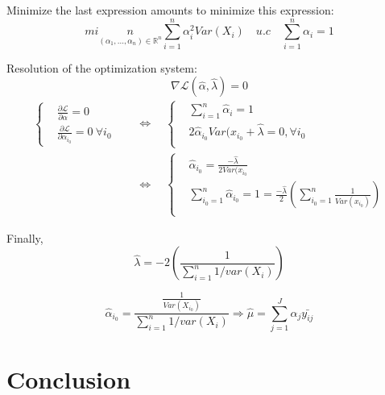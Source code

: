 \documentclass[unknownkeysallowed]{beamer}
\begin{document}
\begin{frame}
Minimize the last expression amounts to minimize this expression: 
    $$ min\limits_{(\alpha_{1},...,\alpha_{n})\in \mathbb{R}^{n}} \sum\limits_{i=1}^{n}\alpha_{i}^{2}Var(X_{i}) \quad u.c \quad  \sum\limits_{i=1}^{n}\alpha_{i}=1 $$
\begin{itemize}\setlength{\itemsep}{5pt}
\end{itemize}
Resolution of the optimization system:
\[\nabla \mathcal{L}(\hat\alpha,\hat\lambda)=0\]
\[
\begin{aligned}
\begin{cases}
&  \frac{\partial \mathcal{L}}{\partial \alpha}=0 \\
&  \frac{\partial \mathcal{L}}{\partial \alpha_{i_0}}=0\ \forall i_0 
\end{cases}
\quad&\Longleftrightarrow\quad
\begin{cases}
&  \sum\limits_{i=1}^{n}\hat{\alpha}_i=1 \\
&  2\hat\alpha_{i_0}Var(x_{i_0} + \hat\lambda =0, \forall{i_0}  \\
\end{cases}\\
& \Longleftrightarrow\quad
\begin{cases}
&  \hat\alpha_{i_0}=\frac{-\hat\lambda}{2Var(x_{i_0}} \\
& \sum\limits_{i_{0}=1}^{n}\hat{\alpha}_i_{0}=1=\frac{-\hat\lambda}{2}(\sum_{i_{0}=1}^{n}\frac{1}{Var(x_{i_0})}) \\

\end{cases}
\end{aligned}
\]
\end{frame}
\begin{frame}
    Finally, $$ \hat \lambda = -2(\frac{1}{\sum_{i=1}^{n}1/var(X_{i})})$$
    
     $$\hat\alpha_{i_0}=\frac{\frac{1}{Var(X_i_0)}}{\sum_{i=1}^{n}1/var(X_{i})} 
    \Longrightarrow \hat\mu = \sum_{j=1}^{J}\alpha_{j}\bar{y_{ij}}$$
\end{frame}


\section{Conclusion}
\label{sec:conclusion}
\end{document}
